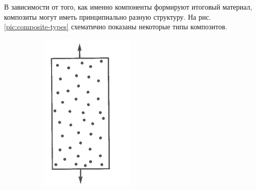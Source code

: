 В зависимости от того, как именно компоненты формируют итоговый материал, композиты могут иметь принципиально разную структуру. На рис. \ref{pic:composite-types} схематично показаны некоторые типы композитов.

\begin{figure}[h]
\centering
\begin{subfigure}[b]{0.2\textwidth}
\centering
\includegraphics[width=\textwidth]{png/composites-types-1.png}
\caption{ }
\end{subfigure}
\begin{subfigure}[b]{0.2\textwidth}

\end{subfigure}
\end{figure}
